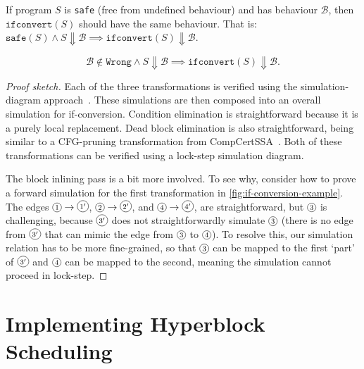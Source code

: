 \begin{theorem}\label{def:forwardsim}
  If program $S$ is \texttt{safe} (free from
  undefined behaviour) and has behaviour
  $\mathcal{B}$, then $\mathtt{ifconvert}(S)$ should have the same behaviour. That is: $\mathtt{safe}(S) \land S \Downarrow \mathcal{B} \implies \mathtt{ifconvert}(S) \Downarrow \mathcal{B}$.

  {\normalfont\begin{equation}
    \mathcal{B} \not\in \texttt{Wrong} \land S \Downarrow \mathcal{B} \implies
    \texttt{ifconvert}(S) \Downarrow \mathcal{B}.
  \end{equation}}

  \begin{proof}[Proof sketch]
    Each of the three transformations is verified using the simulation-diagram
    approach~\cite[p.~379]{leroy09_formal_verif_compil_back_end}. These
    simulations are then composed into an overall simulation for if-conversion.
    Condition elimination is straightforward because it is a purely local
    replacement.
    Dead block elimination is also straightforward, being similar to a
    CFG-pruning transformation from
    CompCertSSA~\cite{barthe14_formal_verif_ssa_based_middl_end_compc}.  Both of
    these transformations can be verified using a lock-step simulation diagram.

    The block inlining pass is a bit more involved.  To see why, consider how to
    prove a forward simulation for the first transformation in
    \cref{fig:if-conversion-example}. The edges
    $\diaglabel{$1$}\rightarrow\diaglabel{$1^\prime$}$,
    $\diaglabel{$2$}\rightarrow\diaglabel{$2^\prime$}$, and
    $\diaglabel{$4$}\rightarrow\diaglabel{$4^\prime$}$, are straightforward, but
    $\diaglabel{$3$}$ is challenging, because $\diaglabel{$3^\prime$}$ does not
    straightforwardly simulate $\diaglabel{$3$}$ (there is no edge from
    $\diaglabel{$3^\prime$}$ that can mimic the edge from $\diaglabel{$3$}$ to
    $\diaglabel{$4$}$). To resolve this, our simulation relation has to be more
    fine-grained, so that $\diaglabel{$3$}$ can be mapped to the first `part' of
    $\diaglabel{$3^\prime$}$ and $\diaglabel{$4$}$ can be mapped to the second, meaning the simulation cannot proceed in lock-step.
  \end{proof}
\end{theorem}

\section{Implementing Hyperblock Scheduling}
\label{sec:hs:implementing-scheduling}


